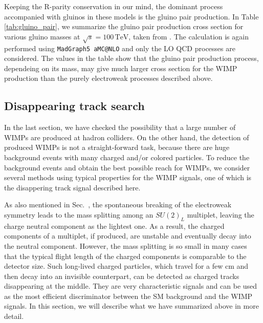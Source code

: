 \documentclass[12pt,twoside,book]{article}
\begin{document}
Keeping the R-parity conservation in our mind, the dominant process accompanied with gluinos in these models is the gluino pair production.
In Table \ref{tab:gluino_pair}, we summarize the gluino pair production cross section for various gluino masses at $\sqrt{s} = 100\,\mathrm{TeV}$, taken from \cite{Asai:2019wst}.
The calculation is again performed using \texttt{MadGraph5 aMC@NLO} and only the LO QCD processes are considered.
The values in the table show that the gluino pair production process, dependeing on its mass, may give much larger cross section for the WIMP production than the purely electroweak processes described above.



\subsection{Disappearing track search}
\label{sec:disappearing_track}

In the last section, we have checked the possibility that a large number of WIMPs are produced at hadron colliders.
On the other hand, the detection of produced WIMPs is not a straight-forward task, because there are huge background events with many charged and/or colored particles.
To reduce the background events and obtain the best possible reach for WIMPs, we consider several methods using typical properties for the WIMP signals, one of which is the disappering track signal described here.

As also mentioned in Sec.~, the spontaneous breaking of the electroweak symmetry leads to the mass splitting among an $SU(2)_L$ multiplet, leaving the charge neutral component as the lightest one.
As a result, the charged components of a multiplet, if produced, are unstable and eventually decay into the neutral component.
However, the mass splitting is so small in many cases that the typical flight length of the charged components is comparable to the detector size.
Such long-lived charged particles, which travel for a few $\mathrm{cm}$ and then decay into an invisible counterpart, can be detected as charged tracks disappearing at the middle.
They are very characteristic signals and can be used as the most efficient discriminator between the SM background and the WIMP signals.
In this section, we will describe what we have summarized above in more detail.
\end{document}
